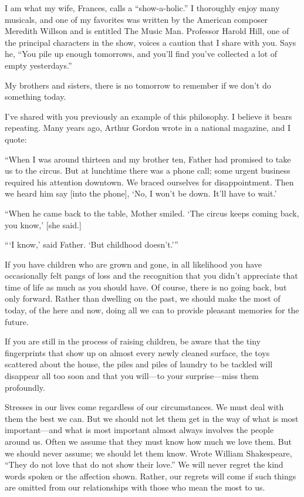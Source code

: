 \documentclass[letterpaper, 11pt]{report}
\begin{document}
I am what my wife, Frances, calls a “show-a-holic.” I thoroughly enjoy many musicals, and one of my favorites was written by the American composer Meredith Willson and is entitled The Music Man. Professor Harold Hill, one of the principal characters in the show, voices a caution that I share with you. Says he, “You pile up enough tomorrows, and you’ll find you’ve collected a lot of empty yesterdays.”

My brothers and sisters, there is no tomorrow to remember if we don’t do something today.

I’ve shared with you previously an example of this philosophy. I believe it bears repeating. Many years ago, Arthur Gordon wrote in a national magazine, and I quote:

“When I was around thirteen and my brother ten, Father had promised to take us to the circus. But at lunchtime there was a phone call; some urgent business required his attention downtown. We braced ourselves for disappointment. Then we heard him say [into the phone], ‘No, I won’t be down. It’ll have to wait.’

“When he came back to the table, Mother smiled. ‘The circus keeps coming back, you know,’ [she said.]

“‘I know,’ said Father. ‘But childhood doesn’t.’”

If you have children who are grown and gone, in all likelihood you have occasionally felt pangs of loss and the recognition that you didn’t appreciate that time of life as much as you should have. Of course, there is no going back, but only forward. Rather than dwelling on the past, we should make the most of today, of the here and now, doing all we can to provide pleasant memories for the future.

If you are still in the process of raising children, be aware that the tiny fingerprints that show up on almost every newly cleaned surface, the toys scattered about the house, the piles and piles of laundry to be tackled will disappear all too soon and that you will—to your surprise—miss them profoundly.

Stresses in our lives come regardless of our circumstances. We must deal with them the best we can. But we should not let them get in the way of what is most important—and what is most important almost always involves the people around us. Often we assume that they must know how much we love them. But we should never assume; we should let them know. Wrote William Shakespeare, “They do not love that do not show their love.” We will never regret the kind words spoken or the affection shown. Rather, our regrets will come if such things are omitted from our relationships with those who mean the most to us.
\end{document}
